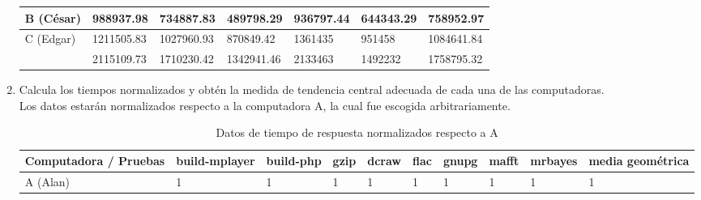 \documentclass{article}
\begin{document}
\begin{enumerate}
{\begin{itemize}
{\begin{table}[H]
\begin{tabular}{|l|l|l|l|l|l|l|}
                            \cellcolor[HTML]{FFFE65}{\color[HTML]{000000}}
                            B (César) & 988937.98 & 734887.83 & 489798.29 
                            & 936797.44 & 644343.29 & 758952.97\\ \hline
            
                            \cellcolor[HTML]{34FF34}{\color[HTML]{000000}} 
                            C (Edgar) & 1211505.83 & 1027960.93 & 870849.42 
                            & 1361435 & 951458 & 1084641.84\\ \hline
            
                            \cellcolor[HTML]{9698ED}{\color[HTML]{000000} 
                            D(Sandra)} & 2115109.73 & 1710230.42 & 1342941.46 
                            & 2133463 & 1492232 & 1758795.32 \\ \hline
                        \end{tabular}
                    \end{table} 
                }
            \end{itemize}
            
        }
        \item {
            Calcula los tiempos normalizados y obtén la medida de tendencia 
            central adecuada de cada una de las computadoras. \\
            
            Los datos estarán normalizados respecto a la computadora A, la cual fue escogida arbitrariamente.

            \begin{table}[H]
                \caption*{Datos de tiempo de respuesta normalizados respecto a A}
                \begin{tabular}{|l|l|l|l|l|l|l|l|l|l|}
                \toprule
                Computadora / Pruebas 
                & \cellcolor[HTML]{DAE8FC}build-mplayer 
                & \cellcolor[HTML]{DAE8FC}build-php 
                & \cellcolor[HTML]{DAE8FC}gzip 
                & \cellcolor[HTML]{DAE8FC}dcraw  
                & \cellcolor[HTML]{DAE8FC}flac 
                & \cellcolor[HTML]{DAE8FC}gnupg 
                & \cellcolor[HTML]{DAE8FC}mafft 
                & \cellcolor[HTML]{DAE8FC}mrbayes 
                & \cellcolor[HTML]{DAE8FC}media geométrica \\ \hline
    
                \cellcolor[HTML]{F8A102}{\color[HTML]{000000}} 
                A (Alan) & 1 & 1 & 1 & 1 & 1 & 1 & 1 & 1 & 1 \\ \hline
    

\end{tabular}
\end{table}}
\end{enumerate}
\end{document}
